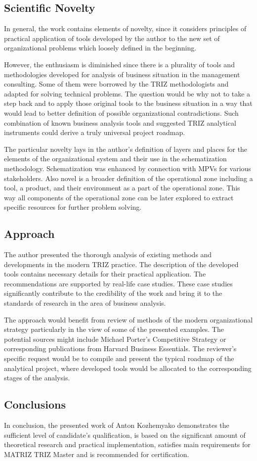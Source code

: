 \subsection*{Scientific Novelty}
In general, the work contains elements of novelty, since it considers
principles of practical application of tools developed by the author to the
new set of organizational problems which loosely defined in the beginning.

However, the enthusiasm is diminished since there is a plurality of tools and
methodologies developed for analysis of business situation in the management
consulting. Some of them were borrowed by the TRIZ methodologists and adapted
for solving technical problems. The question would be why not to take a step
back and to apply those original tools to the business situation in a way that
would lead to better definition of possible organizational contradictions.
Such combination of known business analysis tools and suggested TRIZ
analytical instruments could derive a truly universal project roadmap.

The particular novelty lays in the author’s definition of layers and places
for the elements of the organizational system and their use in the
schematization methodology.  Schematization was enhanced by connection with
MPVs for various stakeholders. Also novel is a broader definition of the
operational zone including a tool, a product, and their environment as a part
of the operational zone. This way all components of the operational zone can
be later explored to extract specific resources for further problem solving.

\subsection*{Approach}
The author presented the thorough analysis of existing methods and
developments in the modern TRIZ practice. The description of the developed
tools contains necessary details for their practical application. The
recommendations are supported by real-life case studies. These case studies
significantly contribute to the credibility of the work and bring it to the
standards of research in the area of business analysis.

The approach would benefit from review of methods of the modern organizational
strategy particularly in the view of some of the presented examples. The
potential sources might include Michael Porter’s Competitive Strategy or
corresponding publications from Harvard Business Essentials. The reviewer’s
specific request would be to compile and present the typical roadmap of the
analytical project, where developed tools would be allocated to the
corresponding stages of the analysis.

\subsection*{Conclusions}
In conclusion, the presented work of Anton Kozhemyako demonstrates the
sufficient level of candidate’s qualification, is based on the significant
amount of theoretical research and practical implementation, satisfies main
requirements for MATRIZ TRIZ Master and is recommended for certification.
